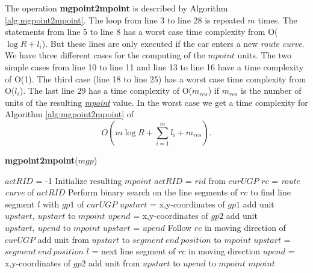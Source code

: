 \documentclass[a4paper]{article}
\newcommand{\op}[1]{\textbf{#1}}
\newcommand{\dt}[1]{\textsl{\underline{#1}}}
\begin{document}
The operation \op{mgpoint2mpoint} is described by Algorithm
\ref{alg:mgpoint2mpoint}. The loop from line 3 to line 28 is repeated $m$ times.
The statements from
line 5 to line 8 has a worst case time complexity from O($\log R + l_i$). But
these lines are only executed if the car enters a new \textit{route curve}.
We have three different cases for the computing of the $mpoint$ units. The
two simple cases from line 10 to line 11 and line 13 to line 16 have a time
complexity of O(1).
The third case (line 18 to line 25) has a worst case time complexity from
O($l_i$). The last line 29 has a time complexity of O($m_{res}$) if $m_{res}$ is
the number of units of the resulting \dt{mpoint} value. In the worst case we get
a time complexity for Algorithm \ref{alg:mgpoint2mpoint} of 
\[O(m \log {R} + \sum_{i=1}^{m}{l_i} + m_{res}).\]
\begin{algorithm}[H]
  \caption{\op{mgpoint2mpoint}($mgp$)}
  \label{alg:mgpoint2mpoint}
  \begin{algorithmic}[1]
    \STATE $actRID$ = -1
    \STATE Initialize resulting $mpoint$
        \STATE $actRID$ = $rid$ from $curUGP$
        \STATE $rc$ = \textit{route curve} of $actRID$
        \STATE Perform binary search on the line segments of $rc$ to find
        line segment $l$ with $gp1$ of $curUGP$
        \STATE $upstart$ = x,y-coordinates of $gp1$
      \ENDIF
        \STATE add unit $upstart,\ upstart$ to $mpoint$
      \ELSE
          \STATE $upend$ = x,y-coordinates of $gp2$
          \STATE add unit $upstart,\ upend$ to $mpoint$
          \STATE $upstart$ = $upend$
        \ELSE
          \STATE Follow $rc$ in moving direction of $curUGP$
            \STATE add unit from $upstart$ to $segment\ end\ position$ to
$mpoint$
            \STATE $upstart$ = $segment\ end\ position$
            \STATE $l$ = next line segment of $rc$ in moving direction
          \ENDWHILE
          \STATE $upend$ = x,y-coordinates of $gp2$
          \STATE add unit from $upstart$ to $upend$ to $mpoint$
        \ENDIF
      \ENDIF
    \ENDFOR
    \RETURN $mpoint$
  \end{algorithmic}
\end{algorithm}
\end{document}
